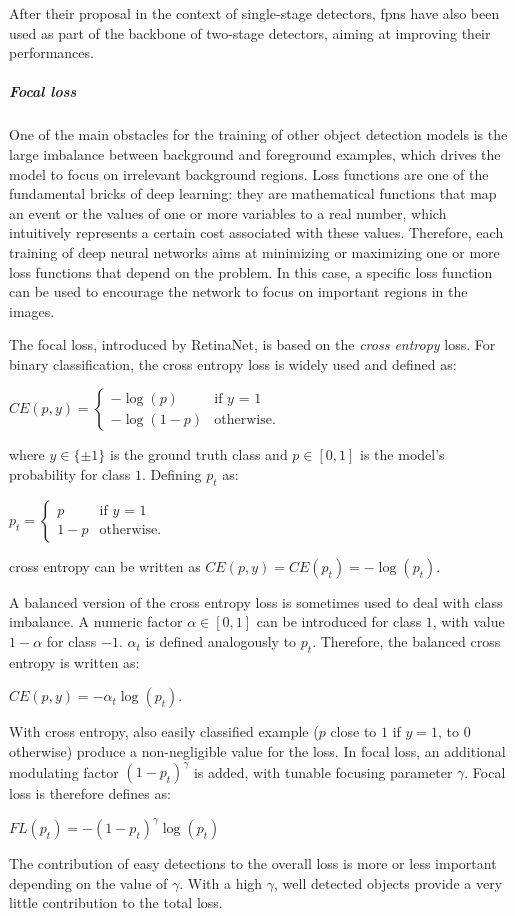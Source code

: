 \documentclass[%
    corpo=12pt,
    twoside,
    stile=classica,   
    tipotesi=magistrale,
    evenboxes,
    english,
	numerazioneromana,
]{toptesi}
\begin{document}
After their proposal in the context of single-stage detectors, \glspl{fpn} have also been used as part of the backbone of two-stage detectors, aiming at improving their performances.

\subparagraph{Focal loss}
One of the main obstacles for the training of other object detection models is the large imbalance between background and foreground examples, which drives the model to focus on irrelevant background regions. Loss functions are one of the fundamental bricks of deep learning: they are mathematical functions that map an event or the values of one or more variables to a real number, which intuitively represents a certain cost associated with these values. Therefore, each training of deep neural networks aims at minimizing or maximizing one or more loss functions that depend on the problem. In this case, a specific loss function can be used to encourage the network to focus on important regions in the images.

\bigskip
The focal loss, introduced by RetinaNet, is based on the \textit{cross entropy} loss. For binary classification, the cross entropy loss is widely used and defined as:
\begin{center}
	$CE(p,y) = \begin{cases}
		-\log(p) & \text{if $y$ = 1}\\
		-\log(1-p) & \text{otherwise.}
	\end{cases}$
\end{center}
where $y\in \{\pm 1\}$ is the ground truth class and $p\in\left[0,1\right]$ is the model's probability for class $1$. Defining $p_t$ as:
\begin{center}
	$p_t = \begin{cases}
		p & \text{if $y$ = 1}\\
		1-p & \text{otherwise.}
	\end{cases}$
\end{center}
cross entropy can be written as $CE(p,y) = CE(p_t) = -\log(p_t)$.

\bigskip
A balanced version of the cross entropy loss is sometimes used to deal with class imbalance. A numeric factor $\alpha\in\left[0,1\right]$ can be introduced for class $1$, with value $1-\alpha$ for class $-1$. $\alpha_t$ is defined analogously to $p_t$. Therefore, the balanced cross entropy is written as:
\begin{center}
	$CE(p,y) = -\alpha_t\log(p_t)$.
\end{center}

\bigskip
With cross entropy, also easily classified example ($p$ close to $1$ if $y=1$, to $0$ otherwise) produce a non-negligible value for the loss. In focal loss, an additional modulating factor $\left(1-p_t\right)^\gamma$ is added, with tunable focusing parameter $\gamma$. Focal loss is therefore defines as:
\begin{center}
	$FL(p_t) = -\left(1-p_t\right)^\gamma \log(p_t)$
\end{center}
The contribution of easy detections to the overall loss is more or less important depending on the value of $\gamma$. With a high $\gamma$, well detected objects provide a very little contribution to the total loss.
\end{document}
